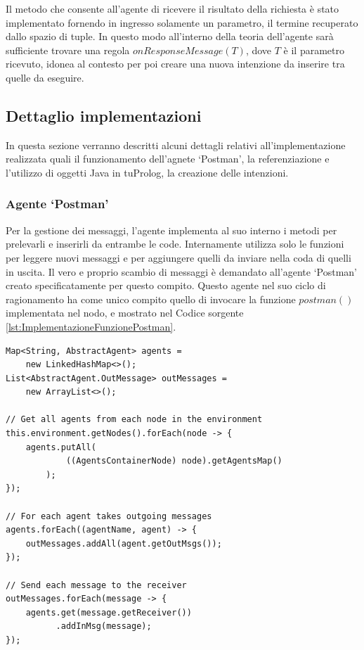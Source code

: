 Il metodo che consente all'agente di ricevere il risultato della richiesta è stato implementato fornendo in ingresso solamente un parametro, il termine recuperato dallo spazio di tuple. In questo modo all'interno della teoria dell'agente sarà sufficiente trovare una regola $onResponseMessage(T)$, dove $T$ è il parametro ricevuto, idonea al contesto per poi creare una nuova intenzione da inserire tra quelle da eseguire.

\subsection{Dettaglio implementazioni}\label{sctn:DettaglioImplementazioni}
In questa sezione verranno descritti alcuni dettagli relativi all'implementazione realizzata quali il funzionamento dell'agnete `Postman', la referenziazione e l'utilizzo di oggetti Java in tuProlog, la creazione delle intenzioni.

\subsubsection{Agente `Postman'}
Per la gestione dei messaggi, l'agente implementa al suo interno i metodi per prelevarli e inserirli da entrambe le code. Internamente utilizza solo le funzioni per leggere nuovi messaggi e per aggiungere quelli da inviare nella coda di quelli in uscita.
Il vero e proprio scambio di messaggi è demandato all'agente `Postman' creato specificatamente per questo compito. Questo agente nel suo ciclo di ragionamento ha come unico compito quello di invocare la funzione $postman()$ implementata nel nodo, e mostrato nel Codice sorgente \ref{lst:ImplementazioneFunzionePostman}.
\medskip
\begin{lstlisting}[float,firstnumber=1,label={lst:ImplementazioneFunzionePostman},caption={Implementazione funzione Postman}]
Map<String, AbstractAgent> agents =
	new LinkedHashMap<>();
List<AbstractAgent.OutMessage> outMessages =
	new ArrayList<>();

// Get all agents from each node in the environment
this.environment.getNodes().forEach(node -> {
    agents.putAll(
    		((AgentsContainerNode) node).getAgentsMap()
    	);
});

// For each agent takes outgoing messages
agents.forEach((agentName, agent) -> {
    outMessages.addAll(agent.getOutMsgs());
});

// Send each message to the receiver
outMessages.forEach(message -> {
    agents.get(message.getReceiver())
          .addInMsg(message);
});
\end{lstlisting}

